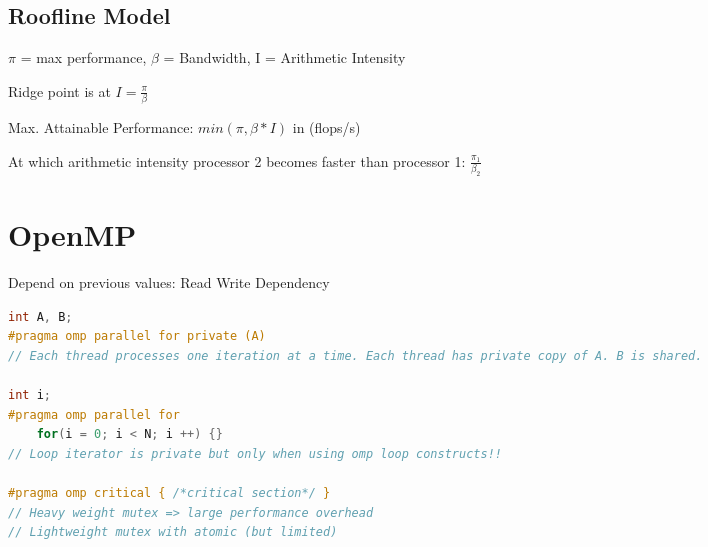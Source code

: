 \begin{multicols*}{4}
\subsection{Roofline Model}

$\pi$ = max performance, $\beta$ = Bandwidth, I = Arithmetic Intensity

Ridge point is at \(I = \frac{\pi}{\beta}\)

Max. Attainable Performance: \(min(\pi, \beta * I)\) in (flops/s)

At which arithmetic intensity processor 2 becomes faster than processor 1: \(\frac{\pi_1}{\beta_2}\)

\section{OpenMP}
Depend on previous values: Read Write Dependency
	\begin{lstlisting}[language=c]
int A, B;
#pragma omp parallel for private (A)
// Each thread processes one iteration at a time. Each thread has private copy of A. B is shared.

int i;
#pragma omp parallel for
	for(i = 0; i < N; i ++) {}
// Loop iterator is private but only when using omp loop constructs!!

#pragma omp critical { /*critical section*/ }
// Heavy weight mutex => large performance overhead
// Lightweight mutex with atomic (but limited)
\end{lstlisting}

\end{multicols*}
